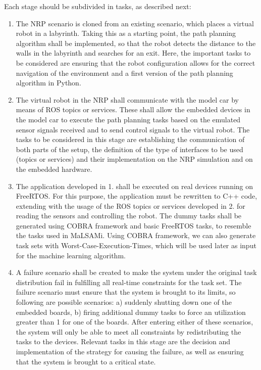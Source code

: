 Each stage should be subdivided in tasks, as described next:
\begin{enumerate}
\item	The NRP scenario is cloned from an existing scenario, which places a virtual robot in a labyrinth. Taking this as a starting point, the path planning algorithm shall be implemented, so that the robot detects the distance to the walls in the labyrinth and searches for an exit. Here, the important tasks to be considered are ensuring that the robot configuration allows for the correct navigation of the environment and a first version of the path planning algorithm in Python.
\item	The virtual robot in the NRP shall communicate with the model car by means of ROS topics or services. These shall allow the embedded devices in the model car to execute the path planning tasks based on the emulated sensor signals received and to send control signals to the virtual robot. The tasks to be considered in this stage are establishing the communication of both parts of the setup, the definition of the type of interfaces to be used (topics or services) and their implementation on the NRP simulation and on the embedded hardware.
\item	The application developed in 1. shall be executed on real devices running on FreeRTOS. For this purpose, the application must be rewritten to C++ code, extending with the usage of the ROS topics or services developed in 2. for reading the sensors and controlling the robot. The dummy tasks shall be generated using COBRA framework and basic FreeRTOS tasks, to resemble the tasks used in MaLSAMi. Using COBRA framework, we can also generate task sets with Worst-Case-Execution-Times, which will be used later as input for the machine learning algorithm.
\item	A failure scenario shall be created to make the system under the original task distribution fail in fulfilling all real-time constraints for the task set. The failure scenario must ensure that the system is brought to its limits, so following are possible scenarios: a) suddenly shutting down one of the embedded boards, b) firing additional dummy tasks to force an utilization greater than 1 for one of the boards. After entering either of these scenarios, the system will only be able to meet all constraints by redistributing the tasks to the devices. Relevant tasks in this stage are the decision and implementation of the strategy for causing the failure, as well as ensuring that the system is brought to a critical state.

\end{enumerate}
